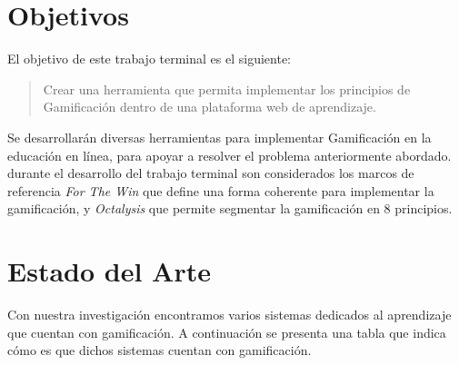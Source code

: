 \clearpage
\section{Objetivos}
\label{sec:objetivos}

\noindent El objetivo de este trabajo terminal es el siguiente:

    \begin{quote}
    \colorbox{blue!05}{\parbox{\dimexpr\linewidth-2\fboxsep}{\strut
        Crear una herramienta que permita implementar los principios
        de Gamificación dentro de una plataforma web de aprendizaje.
    \strut}}
    \end{quote}

\noindent Se desarrollarán diversas herramientas para implementar Gamificación en la educación en línea, para apoyar a resolver el problema anteriormente abordado. durante el desarrollo del trabajo terminal son considerados los marcos de referencia {\it For The Win} \cite{FrameWorkForTheWin} que define una forma coherente para implementar la gamificación, y {\it Octalysis} \cite{libro1} que permite segmentar la gamificación en 8 principios.\\


\section{Estado del Arte}
\label{sec:estadoArte}

    
    Con nuestra investigación encontramos varios sistemas dedicados al aprendizaje que cuentan con gamificación. A continuación se presenta una tabla que indica cómo es que dichos sistemas cuentan con gamificación.
   

